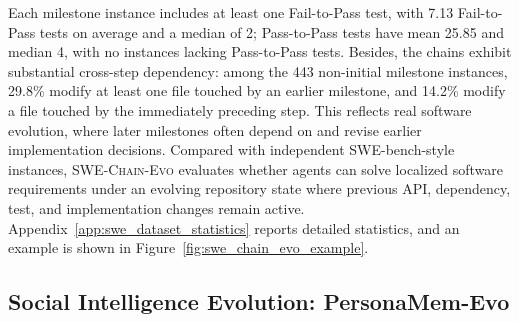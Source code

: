 \documentclass{llmxive}
\begin{document}
Each milestone instance includes at least one Fail-to-Pass test, with 7.13 Fail-to-Pass tests on average and a median of 2; Pass-to-Pass tests have mean 25.85
and median 4, with no instances lacking Pass-to-Pass tests. Besides, the chains exhibit substantial cross-step dependency: among the 443 non-initial milestone
instances, 29.8\% modify at least one file touched by an earlier milestone, and 14.2\% modify a file touched by the immediately preceding step. 
This reflects real
software evolution, where later milestones often depend on and revise earlier implementation decisions. Compared with independent SWE-bench-style instances,
\textsc{SWE-Chain-Evo} evaluates whether agents can solve localized software requirements under an evolving repository state where previous API, dependency,
test, and implementation changes remain active. Appendix~\ref{app:swe_dataset_statistics} reports detailed statistics, and an example is shown in
Figure~\ref{fig:swe_chain_evo_example}.















    













































\subsection{Social Intelligence Evolution: PersonaMem-Evo}
\label{sec:personamem_evo}
\end{document}

